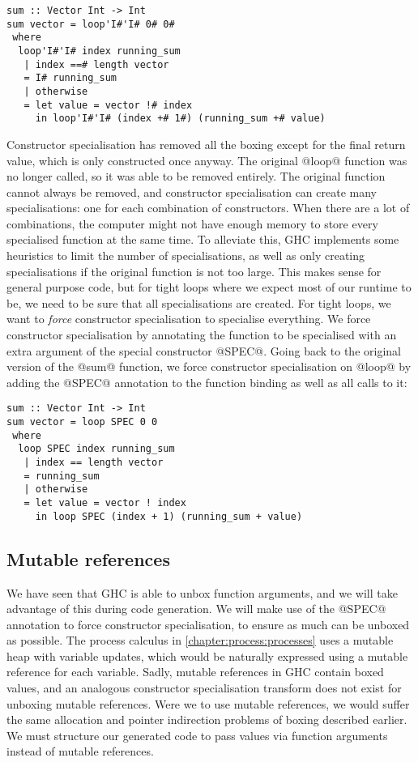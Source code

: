 \begin{lstlisting}
sum :: Vector Int -> Int
sum vector = loop'I#'I# 0# 0#
 where
  loop'I#'I# index running_sum
   | index ==# length vector
   = I# running_sum
   | otherwise
   = let value = vector !# index
     in loop'I#'I# (index +# 1#) (running_sum +# value)
\end{lstlisting}

Constructor specialisation has removed all the boxing except for the final return value, which is only constructed once anyway.
The original @loop@ function was no longer called, so it was able to be removed entirely.
The original function cannot always be removed, and constructor specialisation can create many specialisations: one for each combination of constructors.
When there are a lot of combinations, the computer might not have enough memory to store every specialised function at the same time.
To alleviate this, GHC implements some heuristics to limit the number of specialisations, as well as only creating specialisations if the original function is not too large.
This makes sense for general purpose code, but for tight loops where we expect most of our runtime to be, we need to be sure that all specialisations are created.
For tight loops, we want to \emph{force} constructor specialisation to specialise everything.
We force constructor specialisation by annotating the function to be specialised with an extra argument of the special constructor @SPEC@.
Going back to the original version of the @sum@ function, we force constructor specialisation on @loop@ by adding the @SPEC@ annotation to the function binding as well as all calls to it:

\begin{lstlisting}
sum :: Vector Int -> Int
sum vector = loop SPEC 0 0
 where
  loop SPEC index running_sum
   | index == length vector
   = running_sum
   | otherwise
   = let value = vector ! index
     in loop SPEC (index + 1) (running_sum + value)
\end{lstlisting}

\subsection{Mutable references}
\label{ss:extraction:mutablerefs}

We have seen that GHC is able to unbox function arguments, and we will take advantage of this during code generation.
We will make use of the @SPEC@ annotation to force constructor specialisation, to ensure as much can be unboxed as possible.
The process calculus in \cref{chapter:process:processes} uses a mutable heap with variable updates, which would be naturally expressed using a mutable reference for each variable.
Sadly, mutable references in GHC contain boxed values, and an analogous constructor specialisation transform does not exist for unboxing mutable references.
Were we to use mutable references, we would suffer the same allocation and pointer indirection problems of boxing described earlier.
We must structure our generated code to pass values via function arguments instead of mutable references.

